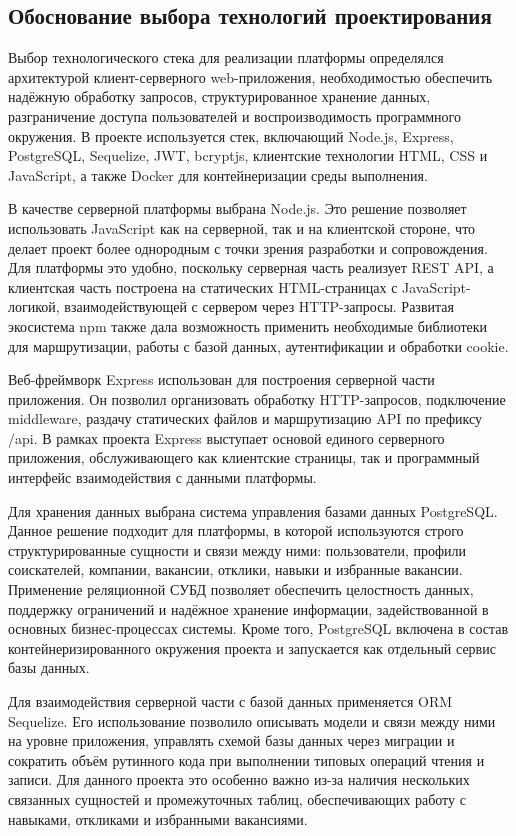 \subsection{Обоснование выбора технологий проектирования}

Выбор технологического стека для реализации платформы определялся архитектурой клиент-серверного web-приложения, необходимостью обеспечить надёжную обработку запросов, структурированное хранение данных, разграничение доступа пользователей и воспроизводимость программного окружения. В проекте используется стек, включающий Node.js, Express, PostgreSQL, Sequelize, JWT, bcryptjs, клиентские технологии HTML, CSS и JavaScript, а также Docker для контейнеризации среды выполнения.

В качестве серверной платформы выбрана Node.js. Это решение позволяет использовать JavaScript как на серверной, так и на клиентской стороне, что делает проект более однородным с точки зрения разработки и сопровождения. Для платформы это удобно, поскольку серверная часть реализует REST API, а клиентская часть построена на статических HTML-страницах с JavaScript-логикой, взаимодействующей с сервером через HTTP-запросы. Развитая экосистема npm также дала возможность применить необходимые библиотеки для маршрутизации, работы с базой данных, аутентификации и обработки cookie.

Веб-фреймворк Express использован для построения серверной части приложения. Он позволил организовать обработку HTTP-запросов, подключение middleware, раздачу статических файлов и маршрутизацию API по префиксу /api. В рамках проекта Express выступает основой единого серверного приложения, обслуживающего как клиентские страницы, так и программный интерфейс взаимодействия с данными платформы.

Для хранения данных выбрана система управления базами данных PostgreSQL. Данное решение подходит для платформы, в которой используются строго структурированные сущности и связи между ними: пользователи, профили соискателей, компании, вакансии, отклики, навыки и избранные вакансии. Применение реляционной СУБД позволяет обеспечить целостность данных, поддержку ограничений и надёжное хранение информации, задействованной в основных бизнес-процессах системы. Кроме того, PostgreSQL включена в состав контейнеризированного окружения проекта и запускается как отдельный сервис базы данных.

Для взаимодействия серверной части с базой данных применяется ORM Sequelize. Его использование позволило описывать модели и связи между ними на уровне приложения, управлять схемой базы данных через миграции и сократить объём рутинного кода при выполнении типовых операций чтения и записи. Для данного проекта это особенно важно из-за наличия нескольких связанных сущностей и промежуточных таблиц, обеспечивающих работу с навыками, откликами и избранными вакансиями.

